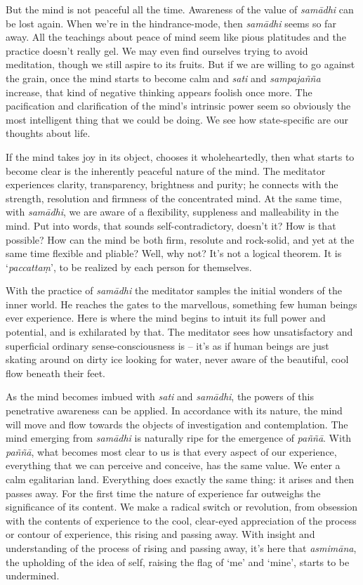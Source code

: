 But the mind is not peaceful all the time. Awareness of the value of
\emph{samādhi} can be lost again. When we're in the hindrance-mode, then
\emph{samādhi} seems so far away. All the teachings about peace of mind
seem like pious platitudes and the practice doesn't really gel. We may
even find ourselves trying to avoid meditation, though we still aspire
to its fruits. But if we are willing to go against the grain, once the
mind starts to become calm and \emph{sati} and \emph{sampajañña}
increase, that kind of negative thinking appears foolish once more. The
pacification and clarification of the mind's intrinsic power seem so
obviously the most intelligent thing that we could be doing. We see how
state-specific are our thoughts about life. 

If the mind takes joy in its object, chooses it wholeheartedly, then
what starts to become clear is the inherently peaceful nature of the
mind. The meditator experiences clarity, transparency, brightness and
purity; he connects with the strength, resolution and firmness of the
concentrated mind. At the same time, with \emph{samādhi}, we are aware
of a flexibility, suppleness and malleability in the mind. Put into
words, that sounds self-contradictory, doesn't it? How is that possible? 
How can the mind be both firm, resolute and rock-solid, and yet at the
same time flexible and pliable? Well, why not? It's not a logical
theorem. It is `\emph{paccattaṃ}', to be realized by each person for
themselves. 

With the practice of \emph{samādhi} the meditator samples the initial
wonders of the inner world. He reaches the gates to the marvellous, 
something few human beings ever experience. Here is where the mind
begins to intuit its full power and potential, and is exhilarated by
that. The meditator sees how unsatisfactory and superficial ordinary
sense-consciousness is -- it's as if human beings are just skating
around on dirty ice looking for water, never aware of the beautiful, 
cool flow beneath their feet. 

As the mind becomes imbued with \emph{sati} and \emph{samādhi}, the
powers of this penetrative awareness can be applied. In accordance with
its nature, the mind will move and flow towards the objects of
investigation and contemplation. The mind emerging from \emph{samādhi}
is naturally ripe for the emergence of \emph{paññā}. With \emph{paññā}, 
what becomes most clear to us is that every aspect of our experience, 
everything that we can perceive and conceive, has the same value. We
enter a calm egalitarian land. Everything does exactly the same thing: 
it arises and then passes away. For the first time the nature of
experience far outweighs the significance of its content. We make a
radical switch or revolution, from obsession with the contents of
experience to the cool, clear-eyed appreciation of the process or
contour of experience, this rising and passing away. With insight and
understanding of the process of rising and passing away, it's here that
\emph{asmimāna}, the upholding of the idea of self, raising the flag of
`me' and `mine', starts to be undermined. 

